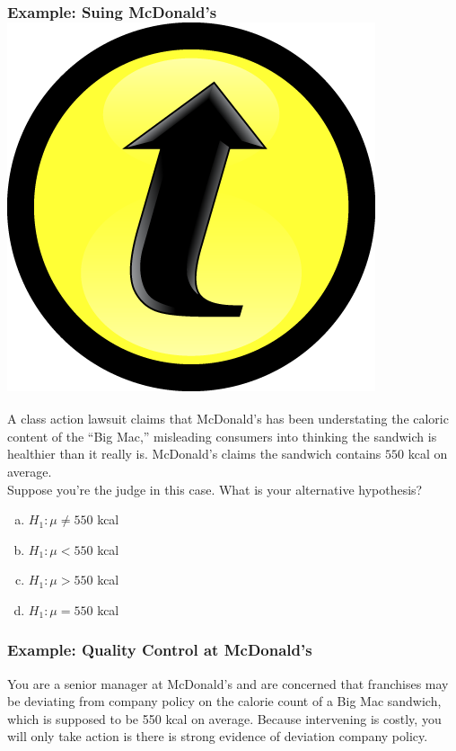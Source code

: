 \documentclass[handout]{beamer}
\begin{document}
\begin{frame}
\frametitle{Example: Suing McDonald's \hfill \includegraphics[scale = 0.05]{./images/clicker}}

A class action lawsuit claims that McDonald's has been  understating the caloric content of the ``Big Mac,'' misleading consumers into thinking the sandwich is healthier than it really is. McDonald's claims the sandwich contains $550$ kcal on average. \\

\vspace{1em}
\alert{Suppose you're the judge in this case. What is your alternative hypothesis?}

	\begin{enumerate}[(a)]
		\item $H_1\colon \mu \neq 550$ kcal
		\item $H_1\colon \mu < 550$ kcal
		\item $H_1\colon \mu > 550$ kcal
		\item $H_1\colon \mu = 550$ kcal
\end{enumerate}
\end{frame}
\begin{frame}
\frametitle{Example: Quality Control at McDonald's}

You are a senior manager at McDonald's and are concerned that franchises may be deviating from company policy on the calorie count of a Big Mac sandwich, which is supposed to be 550 kcal on average. Because intervening is costly, you will only take action is there is strong evidence of deviation company policy. 

\end{frame}
\end{document}
